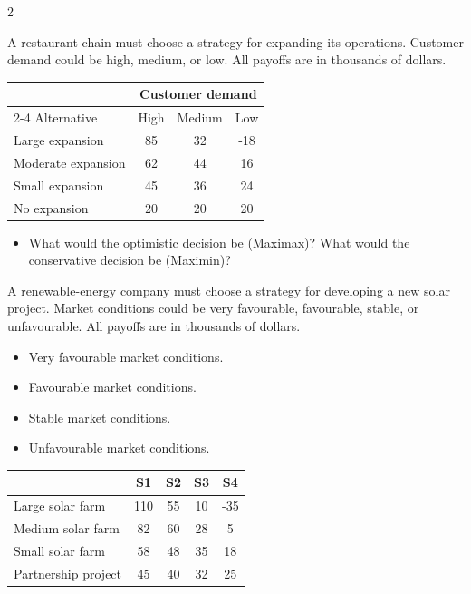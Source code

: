 \begin{multicols}{2}
		
		A restaurant chain must choose a strategy for expanding its operations. Customer demand could be high, medium, or low. All payoffs are in thousands of dollars.
		
		\begin{center}
			\renewcommand{\arraystretch}{1.3}
			\small
			\begin{tabular}{lccc}
				\toprule
				& \multicolumn{3}{c}{Customer demand} \\
				\cmidrule(lr){2-4}
				Alternative & High & Medium & Low \\
				\midrule
				Large expansion & 85 & 32 & -18 \\
				Moderate expansion & 62 & 44 & 16 \\
				Small expansion & 45 & 36 & 24 \\
				No expansion & 20 & 20 & 20 \\
				\bottomrule
			\end{tabular}
		\end{center}
		
		
		\begin{itemize}
			\item [\textbf{(C4)}] What would the optimistic decision be (Maximax)? What would the conservative decision be (Maximin)? 
		\end{itemize}
		
		\columnbreak
		
		A renewable-energy company must choose a strategy for developing a new solar project. Market conditions could be very favourable, favourable, stable, or unfavourable. All payoffs are in thousands of dollars.
		
		\begin{itemize}
			\item[\textbf{S1}] Very favourable market conditions.
			\item[\textbf{S2}] Favourable market conditions.
			\item[\textbf{S3}] Stable market conditions.
			\item[\textbf{S4}] Unfavourable market conditions.
		\end{itemize}
		
		\begin{center}
			\renewcommand{\arraystretch}{1.3}
			\small
			\begin{tabular}{lcccc}
				\toprule
				& S1 & S2 & S3 & S4 \\
				\midrule
				Large solar farm    & 110 & 55 & 10 & -35 \\
				Medium solar farm   & 82  & 60 & 28 & 5   \\
				Small solar farm    & 58  & 48 & 35 & 18  \\
				Partnership project & 45  & 40 & 32 & 25  \\
				\bottomrule
			\end{tabular}
		\end{center}
		

\end{multicols}
